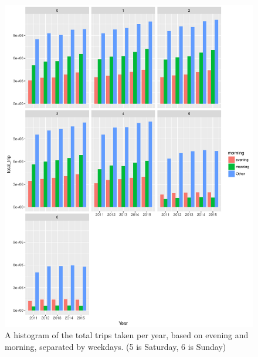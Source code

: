 \documentclass[12pt,twoside]{article}
\begin{document}
\begin{figure}[p] \label{figure1} 
\centerline{\includegraphics[scale=0.6]{Rplot01.pdf}}
\caption{A histogram of the total trips taken per year, based on evening and morning, separated by weekdays. (5 is Saturday, 6 is Sunday)  }
\end{figure}
\end{document}
